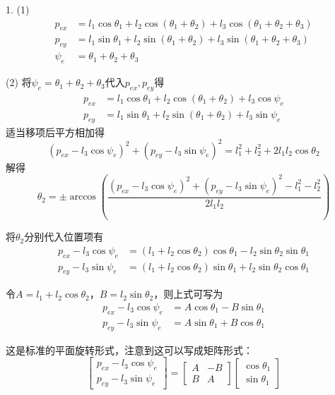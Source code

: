 \documentclass[UTF8, 13pt]{ctexart}
\begin{document}
1.
(1)
\[
\begin{aligned}
p_{ex} &= l_1 \cos\theta_1 + l_2 \cos(\theta_1 + \theta_2) + l_3 \cos(\theta_1 + \theta_2 + \theta_3) \\
p_{ey} &= l_1 \sin\theta_1 + l_2 \sin(\theta_1 + \theta_2) + l_3 \sin(\theta_1 + \theta_2 + \theta_3) \\
\psi_e &= \theta_1 + \theta_2 + \theta_3
\end{aligned}
\]
\vspace{1em}

(2)
将\(\psi_e = \theta_1 + \theta_2 + \theta_3\)代入\(p_{ex},p_{ey}\)得
\[
\begin{aligned}
p_{ex} &= l_1 \cos\theta_1 + l_2 \cos(\theta_1 + \theta_2) + l_3 \cos\psi_e \\
p_{ey} &= l_1 \sin\theta_1 + l_2 \sin(\theta_1 + \theta_2) + l_3 \sin\psi_e
\end{aligned}
\]
适当移项后平方相加得
\[
(p_{ex} - l_3 \cos\psi_e)^2 + (p_{ey} - l_3 \sin\psi_e)^2 = l_1^2 + l_2^2 + 2l_1l_2\cos\theta_2
\]
解得
\[
\theta_2 = \pm \arccos\left(\frac{(p_{ex} - l_3 \cos\psi_e)^2 + (p_{ey} - l_3 \sin\psi_e)^2 - l_1^2 - l_2^2}{2l_1l_2}\right)
\]
\vspace{0.5em}

将\(\theta_2\)分别代入位置项有
\[
\begin{aligned}
p_{ex} - l_3 \cos\psi_e &= (l_1 + l_2 \cos\theta_2) \cos\theta_1 - l_2 \sin\theta_2 \sin\theta_1 \\
p_{ey} - l_3 \sin\psi_e &= (l_1 + l_2 \cos\theta_2) \sin\theta_1 + l_2 \sin\theta_2 \cos\theta_1
\end{aligned}
\]

令\(A = l_1 + l_2 \cos\theta_2\)，\(B = l_2 \sin\theta_2\)，则上式可写为
\[
\begin{aligned}
p_{ex} - l_3 \cos\psi_e &= A \cos\theta_1 - B \sin\theta_1 \\
p_{ey} - l_3 \sin\psi_e &= A \sin\theta_1 + B \cos\theta_1
\end{aligned}
\]

这是标准的平面旋转形式，注意到这可以写成矩阵形式：
\[
\begin{bmatrix} p_{ex} - l_3 \cos\psi_e \\ p_{ey} - l_3 \sin\psi_e \end{bmatrix} = \begin{bmatrix} A & -B \\ B & A \end{bmatrix} \begin{bmatrix} \cos\theta_1 \\ \sin\theta_1 \end{bmatrix}
\]
\end{document}
